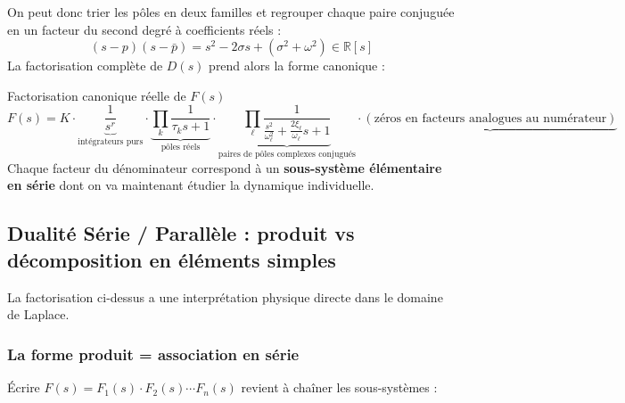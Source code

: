 \documentclass[11pt,a4paper]{report}
\begin{document}
On peut donc trier les pôles en deux familles et regrouper chaque paire conjuguée en un facteur du second degré à coefficients réels :
\[
  (s - p)(s - \bar{p}) = s^2 - 2\sigma s + (\sigma^2 + \omega^2) \in \mathbb{R}[s]
\]
La factorisation complète de $D(s)$ prend alors la forme canonique :

\begin{importantbox}{Factorisation canonique réelle de $F(s)$}
\[
  F(s) = K \cdot
  \underbrace{\frac{1}{s^r}}_{\text{intégrateurs purs}}
  \cdot
  \underbrace{\prod_{k} \frac{1}{\tau_k s + 1}}_{\text{pôles réels}}
  \cdot
  \underbrace{\prod_{\ell} \frac{1}{\frac{s^2}{\omega_{\ell}^2} + \frac{2\xi_\ell}{\omega_{\ell}}s + 1}}_{\text{paires de pôles complexes conjugués}}
  \cdot
  \underbrace{(\text{zéros en facteurs analogues au numérateur})}_{}
\]
Chaque facteur du dénominateur correspond à un \textbf{sous-système élémentaire en série} dont on va maintenant étudier la dynamique individuelle.
\end{importantbox}

\subsection{Dualité Série / Parallèle : produit vs décomposition en éléments simples}

La factorisation ci-dessus a une interprétation physique directe dans le domaine de Laplace.

\subsubsection{La forme produit = association en série}

Écrire $F(s) = F_1(s) \cdot F_2(s) \cdots F_n(s)$ revient à chaîner les sous-systèmes :

\begin{center}
\end{center}
\end{document}
